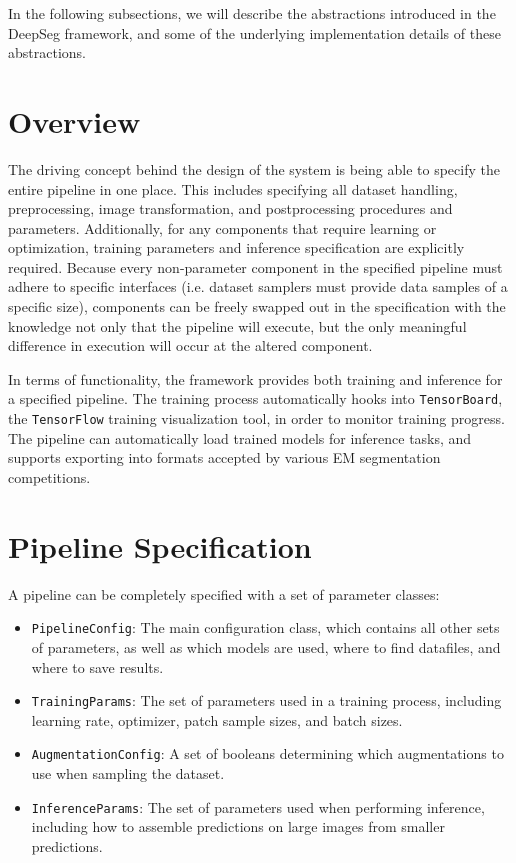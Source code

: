 In the following subsections, we will describe the abstractions introduced in the DeepSeg framework, and some of the underlying implementation details of these abstractions.

\section{Overview}

The driving concept behind the design of the system is being able to specify the entire pipeline in one place. This includes specifying all dataset handling, preprocessing, image transformation, and postprocessing procedures and parameters. Additionally, for any components that require learning or optimization, training parameters and inference specification are explicitly required. Because every non-parameter component in the specified pipeline must adhere to specific interfaces (i.e. dataset samplers must provide data samples of a specific size), components can be freely swapped out in the specification with the knowledge not only that the pipeline will execute, but the only meaningful difference in execution will occur at the altered component.

In terms of functionality, the framework provides both training and inference for a specified pipeline. The training process automatically hooks into \texttt{TensorBoard}, the \texttt{TensorFlow} training visualization tool, in order to monitor training progress. The pipeline can automatically load trained models for inference tasks, and supports exporting into formats accepted by various EM segmentation competitions.

\section{Pipeline Specification}

A pipeline can be completely specified with a set of parameter classes:

\begin{itemize}
\item \texttt{PipelineConfig}: The main configuration class, which contains all other sets of parameters, as well as which models are used, where to find datafiles, and where to save results.
\item \texttt{TrainingParams}: The set of parameters used in a training process, including learning rate, optimizer, patch sample sizes, and batch sizes.
\item \texttt{AugmentationConfig}: A set of booleans determining which augmentations to use when sampling the dataset.
\item \texttt{InferenceParams}: The set of parameters used when performing inference, including how to assemble predictions on large images from smaller predictions.
\end{itemize}

